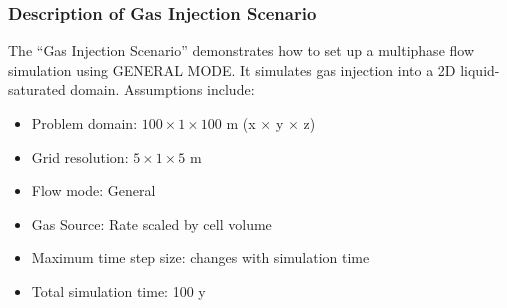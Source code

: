 \documentclass{beamer}
\newcommand\redcomment[1]{{{\color{red} #1}}}
\begin{document}
\begin{frame}\frametitle{Description of Gas Injection Scenario}
The ``Gas Injection Scenario'' demonstrates how to set up a multiphase flow simulation using \redcomment{GENERAL MODE}. It simulates gas injection into a 2D liquid-saturated domain. Assumptions include:
\begin{itemize}
  \item Problem domain: $100 \times 1 \times 100$ m (x $\times$ y $\times$ z)
  \item Grid resolution: $5 \times 1 \times 5$ m 
  \item Flow mode: General
  \item Gas Source: Rate scaled by cell volume
  \item Maximum time step size: changes with simulation time
  \item Total simulation time: 100 y
\end{itemize}

\end{frame}

\end{document}
